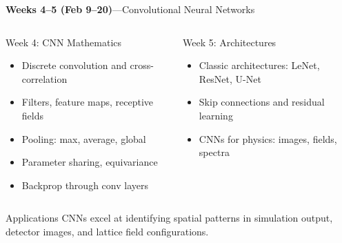 \documentclass[aspectratio=169,11pt]{beamer}
\begin{document}
\begin{frame}{{\color{mlgold}\textbf{Weeks 4--5 (Feb 9--20)}\;---\;Convolutional Neural Networks}}
  \begin{columns}[T]
      \begin{block}{Week 4: CNN Mathematics}
        \begin{itemize}\itemsep1pt
          \item Discrete convolution and cross-correlation
          \item Filters, feature maps, receptive fields
          \item Pooling: max, average, global
          \item Parameter sharing, equivariance
          \item Backprop through conv layers
        \end{itemize}
      \end{block}
      \begin{block}{Week 5: Architectures }
        \begin{itemize}\itemsep1pt
          \item Classic architectures: LeNet, ResNet, U-Net
          \item Skip connections and residual learning
          \item CNNs for physics: images, fields, spectra
        \end{itemize}
      \end{block}
  \end{columns}
  \vspace{4pt}
  \begin{exampleblock}{Applications}
    CNNs excel at identifying spatial patterns in simulation
    output, detector images, and lattice field configurations.
  \end{exampleblock}
\end{frame}
\end{document}
